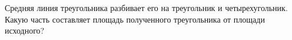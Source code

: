 \begin{ex}
	\begin{condition}
		Средняя линия треугольника разбивает его на треугольник и четырехугольник. Какую часть составляет площадь полученного треугольника от площади исходного?
	\end{condition}
\end{ex}